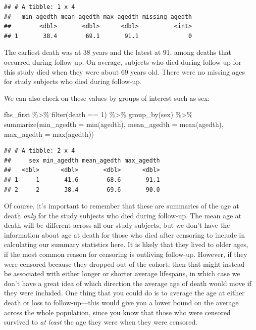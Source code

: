 \documentclass[
]{book}
\newenvironment{Shaded}{\begin{snugshade}}{\end{snugshade}}
\newcommand{\AttributeTok}[1]{\textcolor[rgb]{0.77,0.63,0.00}{#1}}
\newcommand{\DecValTok}[1]{\textcolor[rgb]{0.00,0.00,0.81}{#1}}
\newcommand{\FunctionTok}[1]{\textcolor[rgb]{0.00,0.00,0.00}{#1}}
\newcommand{\NormalTok}[1]{#1}
\newcommand{\SpecialCharTok}[1]{\textcolor[rgb]{0.00,0.00,0.00}{#1}}
\begin{document}
\begin{verbatim}
## # A tibble: 1 x 4
##   min_agedth mean_agedth max_agedth missing_agedth
##        <dbl>       <dbl>      <dbl>          <int>
## 1       38.4        69.1       91.1              0
\end{verbatim}

The earliest death was at 38 years and the latest at 91, among deaths that occurred during follow-up. On average, subjects who died during follow-up for this study died when they were about 69 years old. There were no missing ages for study subjects who died during follow-up.

We can also check on these values by groups of interest such as sex:

\begin{Shaded}
\begin{Highlighting}[]
\NormalTok{fhs\_first }\SpecialCharTok{\%\textgreater{}\%}
  \FunctionTok{filter}\NormalTok{(death }\SpecialCharTok{==} \DecValTok{1}\NormalTok{) }\SpecialCharTok{\%\textgreater{}\%} 
  \FunctionTok{group\_by}\NormalTok{(sex) }\SpecialCharTok{\%\textgreater{}\%}
  \FunctionTok{summarize}\NormalTok{(}\AttributeTok{min\_agedth =} \FunctionTok{min}\NormalTok{(agedth),}
            \AttributeTok{mean\_agedth =} \FunctionTok{mean}\NormalTok{(agedth),}
            \AttributeTok{max\_agedth =} \FunctionTok{max}\NormalTok{(agedth))}
\end{Highlighting}
\end{Shaded}

\begin{verbatim}
## # A tibble: 2 x 4
##     sex min_agedth mean_agedth max_agedth
##   <dbl>      <dbl>       <dbl>      <dbl>
## 1     1       41.6        68.6       91.1
## 2     2       38.4        69.6       90.0
\end{verbatim}

Of course, it's important to remember that these are summaries of the age at death \emph{only} for the study subjects who died during follow-up. The mean age at death will be different across all our study subjects, but we don't have the information about age at death for those who died after censoring to include in calculating our summary statistics here. It is likely that they lived to older ages, if the most common reason for censoring is outliving follow-up. However, if they were censored because they dropped out of the cohort, then that might instead be associated with either longer or shorter average lifespans, in which case we don't have a great idea of which direction the average age of death would move if they were included. One thing that you could do is to average the age at either death or loss to follow-up---this would give you a lower bound on the average across the whole population, since you know that those who were censored survived to \emph{at least} the age they were when they were censored.
\end{document}
